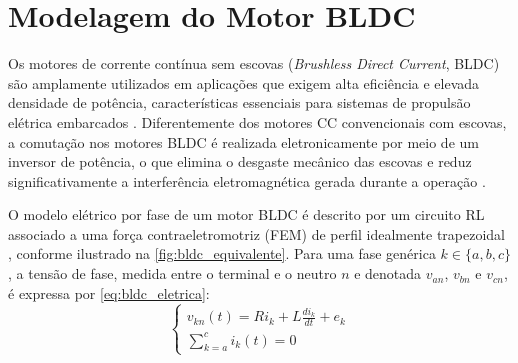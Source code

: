 \section{Modelagem do Motor BLDC}

Os motores de corrente contínua sem escovas (\textit{Brushless Direct Current}, BLDC) são amplamente utilizados em aplicações que exigem alta eficiência e elevada densidade de potência, características essenciais para sistemas de propulsão elétrica embarcados \cite{Krishnan2017}. Diferentemente dos motores CC convencionais com escovas, a comutação nos motores BLDC é realizada eletronicamente por meio de um inversor de potência, o que elimina o desgaste mecânico das escovas e reduz significativamente a interferência eletromagnética gerada durante a operação \cite{Fitzgerald2014}.

O modelo elétrico por fase de um motor BLDC é descrito por um circuito RL associado a uma força contraeletromotriz (FEM) de perfil idealmente trapezoidal \cite{Krishnan2017}, conforme ilustrado na \autoref{fig:bldc_equivalente}. Para uma fase genérica $k \in \{a, b, c\}$, a tensão de fase, medida entre o terminal e o neutro $n$ e denotada $v_{an}$, $v_{bn}$ e $v_{cn}$, é expressa por \eqref{eq:bldc_eletrica}:
\begin{equation}
    \begin{cases}
    v_{kn}(t) = R i_k + L \frac{di_k}{dt} + e_k \\ 
    \sum_{k=a}^c i_k(t) = 0
    \end{cases}
    \label{eq:bldc_eletrica}
\end{equation}

